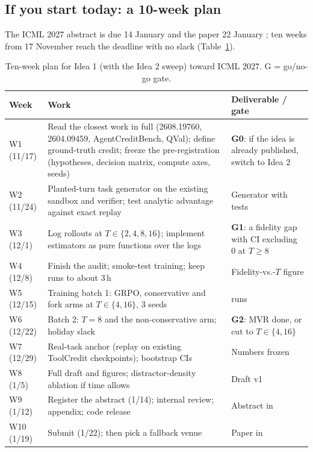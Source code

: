 \subsection{If you start today: a 10-week plan}

The ICML 2027 abstract is due 14 January and the paper 22 January \citep{icml2027reciprocal}; ten weeks from 17 November reach the deadline with no slack (Table~\ref{tab:agenda-plan}).

\begin{table}[t]
\centering
\footnotesize
\caption{Ten-week plan for Idea 1 (with the Idea 2 sweep) toward ICML 2027. G = go/no-go gate.}
\label{tab:agenda-plan}
\begin{tabularx}{\linewidth}{@{}>{\raggedright\arraybackslash}p{1.5cm}>{\raggedright\arraybackslash}X>{\raggedright\arraybackslash}p{3.2cm}@{}}
\toprule
Week & Work & Deliverable / gate \\
\midrule
W1 (11/17) & Read the closest work in full (2608.19760, 2604.09459, AgentCreditBench, QVal); define ground-truth credit; freeze the pre-registration (hypotheses, decision matrix, compute axes, seeds) & \textbf{G0}: if the idea is already published, switch to Idea 2 \\
W2 (11/24) & Planted-turn task generator on the existing sandbox and verifier; test analytic advantage against exact replay & Generator with tests \\
W3 (12/1) & Log rollouts at $T\in\{2,4,8,16\}$; implement estimators as pure functions over the logs & \textbf{G1}: a fidelity gap with CI excluding 0 at $T\geq8$ \\
W4 (12/8) & Finish the audit; smoke-test training; keep runs to about 3\,h & Fidelity-vs.-$T$ figure \\
W5 (12/15) & Training batch 1: GRPO, conservative and fork arms at $T\in\{4,16\}$, 3 seeds & 18 runs \\
W6 (12/22) & Batch 2: $T{=}8$ and the non-conservative arm; holiday slack & \textbf{G2}: MVR done, or cut to $T\in\{4,16\}$ \\
W7 (12/29) & Real-task anchor (replay on existing ToolCredit checkpoints); bootstrap CIs & Numbers frozen \\
W8 (1/5) & Full draft and figures; distractor-density ablation if time allows & Draft v1 \\
W9 (1/12) & Register the abstract (1/14); internal review; appendix; code release & Abstract in \\
W10 (1/19) & Submit (1/22); then pick a fallback venue & Paper in \\
\bottomrule
\end{tabularx}
\end{table}

